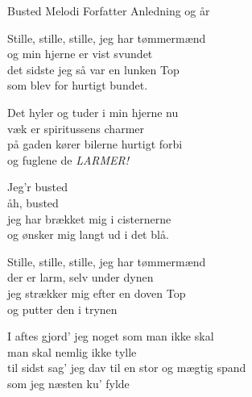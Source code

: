 \begin{song}{Busted}
  {} %
  {Melodi} %
  {Forfatter} %
  {Anledning og år} %
  {\NotCCLIed} %

  \begin{SBVerse}
    Stille, stille, stille, jeg har tømmermænd\\
    og min hjerne er vist svundet\\
    det sidste jeg så var en lunken Top\\
    som blev for hurtigt bundet.
  \end{SBVerse}

  \begin{SBVerse}
    Det hyler og tuder i min hjerne nu\\
    væk er spiritussens charmer\\
    på gaden kører bilerne hurtigt forbi\\
    og fuglene de \emph{LARMER!}
  \end{SBVerse}

  \begin{SBChorus}
    Jeg’r busted\\
    åh, busted\\
    jeg har brækket mig i cisternerne\\
    og ønsker mig langt ud i det blå.
  \end{SBChorus}

  \begin{SBVerse}
    Stille, stille, stille, jeg har tømmermænd\\
    der er larm, selv under dynen\\
    jeg strækker mig efter en doven Top\\
    og putter den i trynen
  \end{SBVerse}

  \begin{SBVerse}
    I aftes gjord’ jeg noget som man ikke skal\\
    man skal nemlig ikke tylle\\
    til sidst sag’ jeg dav til en stor og mægtig spand\\
    som jeg næsten ku’ fylde
  \end{SBVerse}


\end{song}
